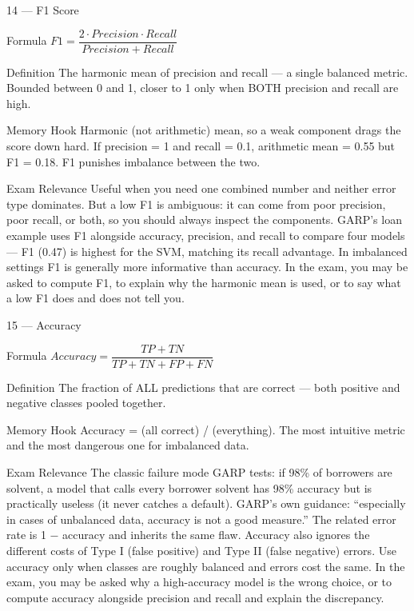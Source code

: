 \documentclass[aspectratio=169,8pt]{beamer}
\begin{document}
	\begin{frame}{14 --- F1 Score}
		\begin{block}{Formula}
			$F1 = \dfrac{2 \cdot Precision \cdot Recall}{Precision + Recall}$
		\end{block}
		\begin{block}{Definition}
			The harmonic mean of precision and recall --- a single balanced metric. Bounded between 0 and 1, closer to 1 only when BOTH precision and recall are high.
		\end{block}
		\begin{block}{Memory Hook}
			Harmonic (not arithmetic) mean, so a weak component drags the score down hard. If precision = 1 and recall = 0.1, arithmetic mean = 0.55 but F1 = 0.18. F1 punishes imbalance between the two.
		\end{block}
		\begin{block}{Exam Relevance}
			Useful when you need one combined number and neither error type dominates. But a low F1 is ambiguous: it can come from poor precision, poor recall, or both, so you should always inspect the components. GARP's loan example uses F1 alongside accuracy, precision, and recall to compare four models --- F1 (0.47) is highest for the SVM, matching its recall advantage. In imbalanced settings F1 is generally more informative than accuracy. In the exam, you may be asked to compute F1, to explain why the harmonic mean is used, or to say what a low F1 does and does not tell you.
		\end{block}
	\end{frame}
	
	\begin{frame}{15 --- Accuracy}
		\begin{block}{Formula}
			$Accuracy = \dfrac{TP + TN}{TP + TN + FP + FN}$
		\end{block}
		\begin{block}{Definition}
			The fraction of ALL predictions that are correct --- both positive and negative classes pooled together.
		\end{block}
		\begin{block}{Memory Hook}
			Accuracy = (all correct) / (everything). The most intuitive metric and the most dangerous one for imbalanced data.
		\end{block}
		\begin{block}{Exam Relevance}
			The classic failure mode GARP tests: if 98\% of borrowers are solvent, a model that calls every borrower solvent has 98\% accuracy but is practically useless (it never catches a default). GARP's own guidance: ``especially in cases of unbalanced data, accuracy is not a good measure.'' The related error rate is 1 $-$ accuracy and inherits the same flaw. Accuracy also ignores the different costs of Type I (false positive) and Type II (false negative) errors. Use accuracy only when classes are roughly balanced and errors cost the same. In the exam, you may be asked why a high-accuracy model is the wrong choice, or to compute accuracy alongside precision and recall and explain the discrepancy.
		\end{block}
	\end{frame}
	
\end{document}
